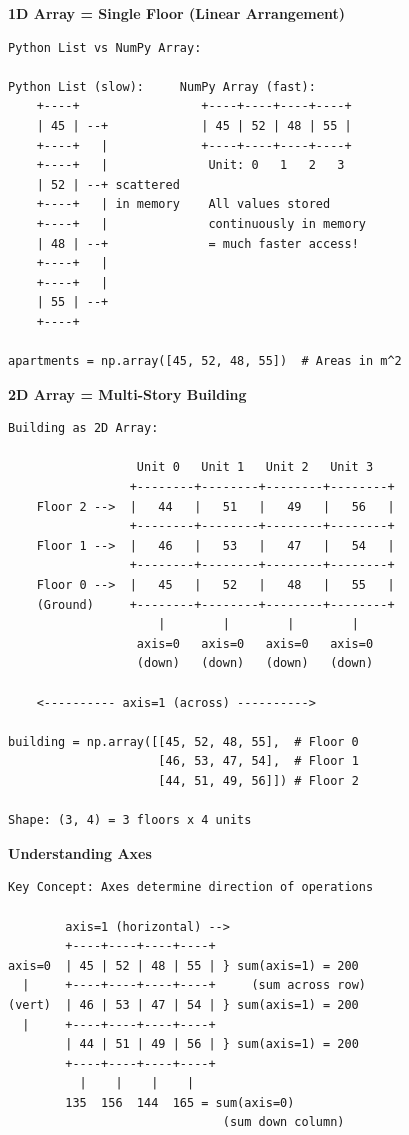 \begin{tcolorbox}[
    title=Visualizing Arrays as Buildings,
    colframe=blue,
    colback = white,
    arc=2mm
    breakable
]
\textbf{1D Array = Single Floor (Linear Arrangement)}
\begin{lstlisting}[basicstyle=\ttfamily\footnotesize,breaklines=true,columns=fullflexible,keepspaces=true,xleftmargin=0pt]
Python List vs NumPy Array:

Python List (slow):     NumPy Array (fast):
    +----+                 +----+----+----+----+
    | 45 | --+             | 45 | 52 | 48 | 55 |
    +----+   |             +----+----+----+----+
    +----+   |              Unit: 0   1   2   3
    | 52 | --+ scattered    
    +----+   | in memory    All values stored
    +----+   |              continuously in memory
    | 48 | --+              = much faster access!
    +----+   |
    +----+   |
    | 55 | --+
    +----+

apartments = np.array([45, 52, 48, 55])  # Areas in m^2

\end{lstlisting}

\textbf{2D Array = Multi-Story Building}
\begin{lstlisting}[basicstyle=\ttfamily\footnotesize,breaklines=true,columns=fullflexible,keepspaces=true,xleftmargin=0pt]
Building as 2D Array:

                  Unit 0   Unit 1   Unit 2   Unit 3
                 +--------+--------+--------+--------+
    Floor 2 -->  |   44   |   51   |   49   |   56   |
                 +--------+--------+--------+--------+
    Floor 1 -->  |   46   |   53   |   47   |   54   |
                 +--------+--------+--------+--------+
    Floor 0 -->  |   45   |   52   |   48   |   55   |
    (Ground)     +--------+--------+--------+--------+
                     |        |        |        |
                  axis=0   axis=0   axis=0   axis=0
                  (down)   (down)   (down)   (down)
    
    <---------- axis=1 (across) ---------->

building = np.array([[45, 52, 48, 55],  # Floor 0
                     [46, 53, 47, 54],  # Floor 1
                     [44, 51, 49, 56]]) # Floor 2

Shape: (3, 4) = 3 floors x 4 units

\end{lstlisting}

\textbf{Understanding Axes}
\begin{lstlisting}[basicstyle=\ttfamily\footnotesize,breaklines=true,columns=fullflexible,keepspaces=true,xleftmargin=0pt]
Key Concept: Axes determine direction of operations

        axis=1 (horizontal) -->
        +----+----+----+----+
axis=0  | 45 | 52 | 48 | 55 | } sum(axis=1) = 200
  |     +----+----+----+----+     (sum across row)
(vert)  | 46 | 53 | 47 | 54 | } sum(axis=1) = 200
  |     +----+----+----+----+
        | 44 | 51 | 49 | 56 | } sum(axis=1) = 200
        +----+----+----+----+
          |    |    |    |
        135  156  144  165 = sum(axis=0)
                              (sum down column)

\end{lstlisting}
\end{tcolorbox}
